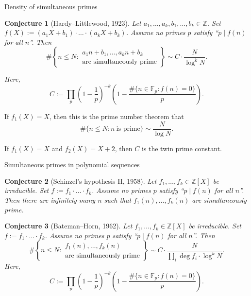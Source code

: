 \documentclass[10pt]{beamer}
\newtheorem{conjecture}{Conjecture}
\begin{document}
\begin{frame}[t]{Density of simultaneous primes}

\begin{conjecture}[Hardy--Littlewood, 1923]
Let $ a_1, \dots, a_k, b_1, \dots, b_k \in \mathbb{Z} $. Set $ f(X) := (a_1X + b_1) \cdot \dots \cdot (a_kX + b_k) $. Assume no primes $ p $ satisfy ``$ p \mid f(n) $ for all $ n $''. Then
$$ \#\left\{n \le N : \begin{array}{c} a_1n + b_1, \dots, a_kn + b_k \\ \text{are simultaneously prime} \end{array}\right\} \sim C \cdot \dfrac{N}{\log^k N}. $$

\pause

Here,
$$ C := \prod_p \left(1 - \dfrac{1}{p}\right)^{-k}\left(1 - \dfrac{\#\{n \in \mathbb{F}_p : f(n) = 0\}}{p}\right). $$
\end{conjecture}

\pause

If $ f_1(X) = X $, then this is the prime number theorem that
$$ \#\{n \le N : n \ \text{is prime}\} \sim \dfrac{N}{\log N}. $$

\pause

If $ f_1(X) = X $ and $ f_2(X) = X + 2 $, then $ C $ is the twin prime constant.

\end{frame}

\begin{frame}[t]{Simultaneous primes in polynomial sequences}

\begin{conjecture}[Schinzel's hypothesis H, 1958]
Let $ f_1, \dots, f_k \in \mathbb{Z}[X] $ be irreducible. Set $ f := f_1 \cdot \dots \cdot f_k $. Assume no primes $ p $ satisfy ``$ p \mid f(n) $ for all $ n $''. Then there are infinitely many $ n $ such that $ f_1(n), \dots, f_k(n) $ are simultaneously prime.
\end{conjecture}

\pause

\vspace{0.5cm}

\begin{conjecture}[Bateman--Horn, 1962]
Let $ f_1, \dots, f_k \in \mathbb{Z}[X] $ be irreducible. Set $ f := f_1 \cdot \dots \cdot f_k $. Assume no primes $ p $ satisfy ``$ p \mid f(n) $ for all $ n $''. Then
$$ \#\left\{n \le N : \begin{array}{c} f_1(n), \dots, f_k(n) \\ \text{are simultaneously prime} \end{array}\right\} \sim C \cdot \dfrac{N}{\prod_i \deg f_i \cdot \log^k N}. $$
Here,
$$ C := \prod_p \left(1 - \dfrac{1}{p}\right)^{-k}\left(1 - \dfrac{\#\{n \in \mathbb{F}_p : f(n) = 0\}}{p}\right). $$
\end{conjecture}

\end{frame}
\end{document}
